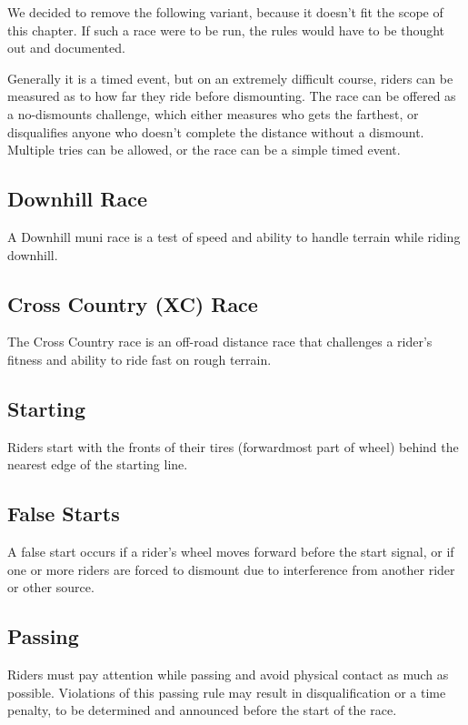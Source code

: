 \begin{comment2016}
We decided to remove the following variant, because it doesn't fit the scope of this chapter.
If such a race were to be run, the rules would have to be thought out and documented.

Generally it is a timed event, but on an extremely difficult course, riders can be measured as to how far they ride before dismounting.
The race can be offered as a no-dismounts challenge, which either measures who gets the farthest, or disqualifies anyone who doesn't complete the distance without a dismount.
Multiple tries can be allowed, or the race can be a simple timed event.
\end{comment2016}

\subsection{Downhill Race \label{sec:muni_downhill}}

A Downhill muni race is a test of speed and ability to handle terrain while riding downhill.

\subsection{Cross Country (XC) Race\label{sec:muni_xc}}

The Cross Country race is an off-road distance race that challenges a rider's fitness and ability to ride fast on rough terrain.

\subsection{Starting}

Riders start with the fronts of their tires (forwardmost part of wheel) behind the nearest edge of the starting line.

\subsection{False Starts}
A false start occurs if a rider's wheel moves forward before the start signal, or if one or more riders are forced to dismount due to interference from another rider or other source.

\subsection{Passing}
Riders must pay attention while passing and avoid physical contact as much as possible.
Violations of this passing rule may result in disqualification or a time penalty, to be determined and announced before the start of the race.


